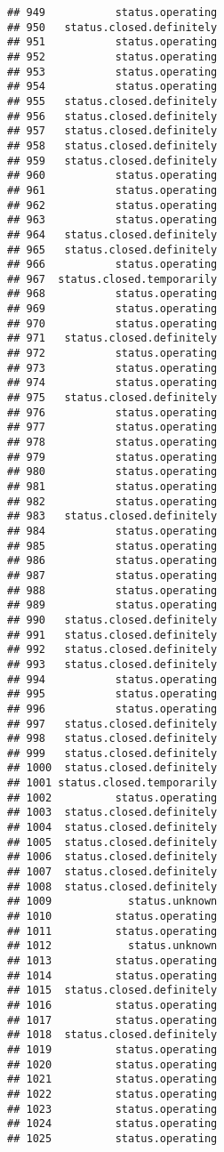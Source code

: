 \documentclass[
]{article}
\begin{document}
\begin{verbatim}
## 949           status.operating
## 950   status.closed.definitely
## 951           status.operating
## 952           status.operating
## 953           status.operating
## 954           status.operating
## 955   status.closed.definitely
## 956   status.closed.definitely
## 957   status.closed.definitely
## 958   status.closed.definitely
## 959   status.closed.definitely
## 960           status.operating
## 961           status.operating
## 962           status.operating
## 963           status.operating
## 964   status.closed.definitely
## 965   status.closed.definitely
## 966           status.operating
## 967  status.closed.temporarily
## 968           status.operating
## 969           status.operating
## 970           status.operating
## 971   status.closed.definitely
## 972           status.operating
## 973           status.operating
## 974           status.operating
## 975   status.closed.definitely
## 976           status.operating
## 977           status.operating
## 978           status.operating
## 979           status.operating
## 980           status.operating
## 981           status.operating
## 982           status.operating
## 983   status.closed.definitely
## 984           status.operating
## 985           status.operating
## 986           status.operating
## 987           status.operating
## 988           status.operating
## 989           status.operating
## 990   status.closed.definitely
## 991   status.closed.definitely
## 992   status.closed.definitely
## 993   status.closed.definitely
## 994           status.operating
## 995           status.operating
## 996           status.operating
## 997   status.closed.definitely
## 998   status.closed.definitely
## 999   status.closed.definitely
## 1000  status.closed.definitely
## 1001 status.closed.temporarily
## 1002          status.operating
## 1003  status.closed.definitely
## 1004  status.closed.definitely
## 1005  status.closed.definitely
## 1006  status.closed.definitely
## 1007  status.closed.definitely
## 1008  status.closed.definitely
## 1009            status.unknown
## 1010          status.operating
## 1011          status.operating
## 1012            status.unknown
## 1013          status.operating
## 1014          status.operating
## 1015  status.closed.definitely
## 1016          status.operating
## 1017          status.operating
## 1018  status.closed.definitely
## 1019          status.operating
## 1020          status.operating
## 1021          status.operating
## 1022          status.operating
## 1023          status.operating
## 1024          status.operating
## 1025          status.operating

\end{verbatim}
\end{document}
